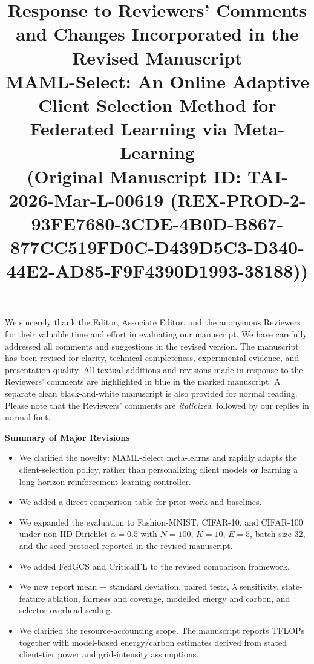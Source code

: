 \documentclass[10pt,psfig]{article}
\newcommand{\paperTitle}{MAML-Select: An Online Adaptive Client Selection Method for Federated Learning via Meta-Learning}
\begin{document}
\title{\small Response to Reviewers' Comments and Changes Incorporated in the Revised Manuscript\\[1.5em]
{\Large \bfseries \paperTitle}\\[0.75em]
(\textbf{Original Manuscript ID: TAI-2026-Mar-L-00619 (REX-PROD-2-93FE7680-3CDE-4B0D-B867-877CC519FD0C-D439D5C3-D340-44E2-AD85-F9F4390D1993-38188)})}
\date{}
\maketitle
\vspace{-1.5em}

We sincerely thank the Editor, Associate Editor, and the anonymous Reviewers for their valuable time and effort in evaluating our manuscript. We have carefully addressed all comments and suggestions in the revised version. The manuscript has been revised for clarity, technical completeness, experimental evidence, and presentation quality. {\color{blue}All textual additions and revisions made in response to the Reviewers' comments are highlighted in blue in the marked manuscript.} A separate clean black-and-white manuscript is also provided for normal reading. Please note that the Reviewers' comments are \textit{italicized}, followed by our replies in normal font.

\vspace{1.5em}
\begin{center}
{\bfseries\Large Summary of Major Revisions}
\end{center}

\begin{itemize}[leftmargin=*,itemsep=0.35em]
    \item We clarified the novelty: MAML-Select meta-learns and rapidly adapts the client-selection policy, rather than personalizing client models or learning a long-horizon reinforcement-learning controller.
    \item We added a direct comparison table for prior work and baselines.
    \item We expanded the evaluation to Fashion-MNIST, CIFAR-10, and CIFAR-100 under non-IID Dirichlet $\alpha=0.5$ with $N=100$, $K=10$, $E=5$, batch size 32, and the seed protocol reported in the revised manuscript.
    \item We added FedGCS and CriticalFL to the revised comparison framework.
    \item We now report mean $\pm$ standard deviation, paired tests, $\lambda$ sensitivity, state-feature ablation, fairness and coverage, modelled energy and carbon, and selector-overhead scaling.
    \item We clarified the resource-accounting scope. The manuscript reports TFLOPs together with model-based energy/carbon estimates derived from stated client-tier power and grid-intensity assumptions.
\end{itemize}
\end{document}
